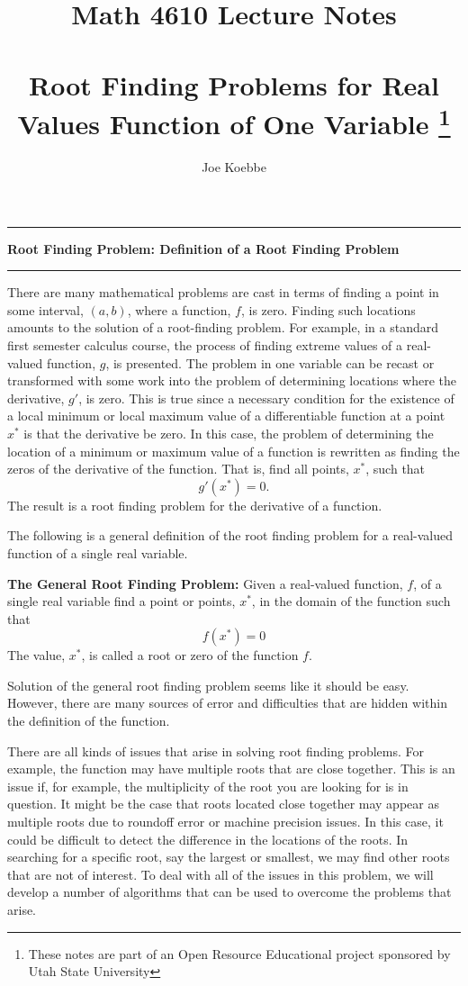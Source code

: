 \documentclass[10pt,fleqn]{article}
\title{Math 4610 Lecture Notes \\
            \ \\
      Root Finding Problems for Real Values Function of One Variable
  \footnote{These notes are part of an Open Resource Educational project
            sponsored by Utah State University}}
\author{Joe Koebbe}
\begin{document}
\maketitle
\newpage
\vskip0.1in\hrule\vskip0.1in
\noindent
{\bf Root Finding Problem: Definition of a Root Finding Problem} 
\vskip0.1in\hrule\vskip0.1in
\noindent
There are many mathematical problems are cast in terms of finding a point in
some interval, $(a,b)$, where a function, $f$, is zero. Finding such locations
amounts to the solution of a root-finding problem. For example, in a standard
first semester calculus course, the process of finding extreme values of a
real-valued function, $g$, is presented. The problem in one variable can be
recast or transformed with some work into the problem of determining locations
where the derivative, $g'$, is zero. This is true since a necessary condition
for the existence of a local minimum or local maximum value of a differentiable
function at a point $x^*$ is that the derivative be zero. In this case, the
problem of determining the location of a minimum or maximum value of a function
is rewritten as finding the zeros of the derivative of the function. That is,
find all points, $x^*$, such that
$$
  g'(x^*)=0.
$$
The result is a root finding problem for the derivative of a function.

The following is a general definition of the root finding problem for a
real-valued function of a single real variable.
\begin{definition}
  {\bf The General Root Finding Problem:} Given a real-valued function, $f$, of
  a single real variable find a point or points, $x^*$, in the domain of the
  function such that
  $$
    f(x^*) = 0
  $$
  The value, $x^*$, is called a root or zero of the function $f$.
\end{definition}
Solution of the general root finding problem seems like it should be easy.
However, there are many sources of error and difficulties that are hidden within
the definition of the function.

There are all kinds of issues that arise in solving root finding problems. For
example, the function may have multiple roots that are close together. This is
an issue if, for example, the multiplicity of the root you are looking for is
in question. It might be the case that roots located close together may appear
as multiple roots due to roundoff error or machine precision issues. In this
case, it could be difficult to detect the difference in the locations of the
roots. In searching for a specific root, say the largest or smallest, we may
find other roots that are not of interest. To deal with all of the issues in
this problem, we will develop a number of algorithms that can be used to
overcome the problems that arise.
\end{document}

